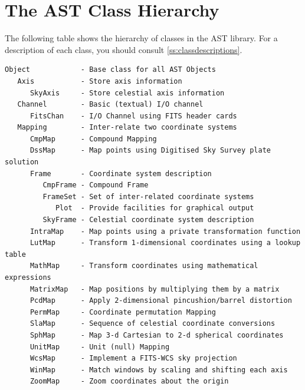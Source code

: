 \documentclass[twoside,11pt]{article}
\newcommand{\appref}[1]{Appendix~\ref{#1}}
\renewcommand{\appref}[1]{\ref{#1}}
\begin{document}

\cleardoublepage
\section{\label{ss:classhierarchy}The AST Class Hierarchy}
The following table shows the hierarchy of classes in the AST library.
For a description of each class, you should consult
\appref{ss:classdescriptions}.

\small
\begin{verbatim}
Object            - Base class for all AST Objects
   Axis           - Store axis information
      SkyAxis     - Store celestial axis information
   Channel        - Basic (textual) I/O channel
      FitsChan    - I/O Channel using FITS header cards
   Mapping        - Inter-relate two coordinate systems
      CmpMap      - Compound Mapping
      DssMap      - Map points using Digitised Sky Survey plate solution
      Frame       - Coordinate system description
         CmpFrame - Compound Frame
         FrameSet - Set of inter-related coordinate systems
            Plot  - Provide facilities for graphical output
         SkyFrame - Celestial coordinate system description
      IntraMap    - Map points using a private transformation function
      LutMap      - Transform 1-dimensional coordinates using a lookup table
      MathMap     - Transform coordinates using mathematical expressions
      MatrixMap   - Map positions by multiplying them by a matrix
      PcdMap      - Apply 2-dimensional pincushion/barrel distortion
      PermMap     - Coordinate permutation Mapping
      SlaMap      - Sequence of celestial coordinate conversions
      SphMap      - Map 3-d Cartesian to 2-d spherical coordinates
      UnitMap     - Unit (null) Mapping
      WcsMap      - Implement a FITS-WCS sky projection
      WinMap      - Match windows by scaling and shifting each axis
      ZoomMap     - Zoom coordinates about the origin
\end{verbatim}
\normalsize

\cleardoublepage
\end{document}
